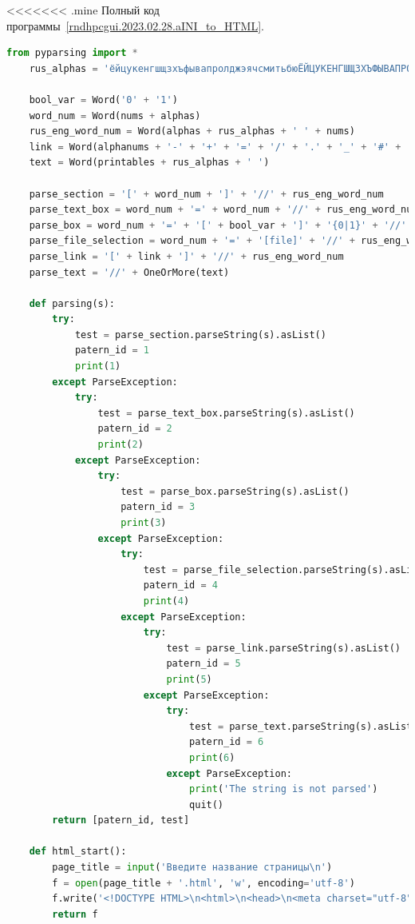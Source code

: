 <<<<<<< .mine
Полный код программы~\ref{rndhpcgui.2023.02.28.aINI_to_HTML}.
\begin{lstlisting}[frame=single, label={rndhpcgui.2023.02.28.aINI_to_HTML}, caption={Пример выходных данных}, language={Python}]
    from pyparsing import *
    rus_alphas = 'ёйцукенгшщзхъфывапролджэячсмитьбюЁЙЦУКЕНГШЩЗХЪФЫВАПРОЛДЖЭЯЧСМИТЬБЮ'

    bool_var = Word('0' + '1')
    word_num = Word(nums + alphas)
    rus_eng_word_num = Word(alphas + rus_alphas + ' ' + nums)
    link = Word(alphanums + '-' + '+' + '=' + '/' + '.' + '_' + '#' + ':' + '&' + '?' + '%')
    text = Word(printables + rus_alphas + ' ')

    parse_section = '[' + word_num + ']' + '//' + rus_eng_word_num
    parse_text_box = word_num + '=' + word_num + '//' + rus_eng_word_num
    parse_box = word_num + '=' + '[' + bool_var + ']' + '{0|1}' + '//' + rus_eng_word_num
    parse_file_selection = word_num + '=' + '[file]' + '//' + rus_eng_word_num
    parse_link = '[' + link + ']' + '//' + rus_eng_word_num
    parse_text = '//' + OneOrMore(text)

    def parsing(s):
        try:
            test = parse_section.parseString(s).asList()
            patern_id = 1
            print(1)
        except ParseException:
            try:
                test = parse_text_box.parseString(s).asList()
                patern_id = 2
                print(2)
            except ParseException:
                try:
                    test = parse_box.parseString(s).asList()
                    patern_id = 3
                    print(3)
                except ParseException:
                    try:
                        test = parse_file_selection.parseString(s).asList()
                        patern_id = 4
                        print(4)
                    except ParseException:
                        try:
                            test = parse_link.parseString(s).asList()
                            patern_id = 5
                            print(5)
                        except ParseException:
                            try:
                                test = parse_text.parseString(s).asList()
                                patern_id = 6
                                print(6)
                            except ParseException:
                                print('The string is not parsed')
                                quit()
        return [patern_id, test]

    def html_start():
        page_title = input('Введите название страницы\n')
        f = open(page_title + '.html', 'w', encoding='utf-8')
        f.write('<!DOCTYPE HTML>\n<html>\n<head>\n<meta charset="utf-8">\n<title>'+page_title+'</title>\n<style>\np.text {text-indent: 20px;}\n</style>\n</head>\n<body>\n<form enctype="multipart/form-data" method="post">\n')
        return f


\end{lstlisting}
